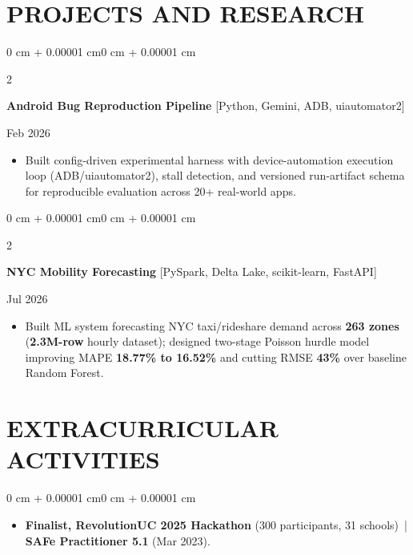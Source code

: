 \documentclass[10pt, letterpaper]{article}
\newenvironment{highlights}{
    \begin{itemize}[
        topsep=0.10 cm,
        parsep=0.06 cm,
        partopsep=0pt,
        itemsep=0.06 cm,
        leftmargin=12pt
    ]
}{
    \end{itemize}
}
\newenvironment{onecolentry}{
    \begin{adjustwidth}{0 cm + 0.00001 cm}{0 cm + 0.00001 cm}
}{
    \end{adjustwidth}
}
\newenvironment{twocolentry}[2][]{
    \onecolentry
    \def\secondColumn{#2}
    \setcolumnwidth{\fill, 4.5 cm}
    \begin{paracol}{2}
}{
    \switchcolumn \raggedleft \secondColumn
    \end{paracol}
    \endonecolentry
}
\begin{document}
\section{PROJECTS AND RESEARCH}
\begin{twocolentry}{Feb 2026}
\textbf{Android Bug Reproduction Pipeline} [Python, Gemini, ADB, uiautomator2]
\end{twocolentry}
\begin{highlights}
  \item Built config-driven experimental harness with device-automation execution loop (ADB/uiautomator2), stall detection, and versioned run-artifact schema for reproducible evaluation across 20+ real-world apps.
\end{highlights}

\vspace{0.12 cm}

\begin{twocolentry}{Jul 2026}
\textbf{NYC Mobility Forecasting} [PySpark, Delta Lake, scikit-learn, FastAPI]
\end{twocolentry}
\begin{highlights}
  \item Built ML system forecasting NYC taxi/rideshare demand across \textbf{263 zones} (\textbf{2.3M-row} hourly dataset); designed two-stage Poisson hurdle model improving MAPE \textbf{18.77\% to 16.52\%} and cutting RMSE \textbf{43\%} over baseline Random Forest.
\end{highlights}

\section{EXTRACURRICULAR ACTIVITIES}
\begin{onecolentry}
\begin{highlights}
  \item \textbf{Finalist, RevolutionUC 2025 Hackathon} (300 participants, 31 schools) \,|\, \textbf{SAFe Practitioner 5.1} (Mar 2023).
\end{highlights}
\end{onecolentry}
\end{document}
